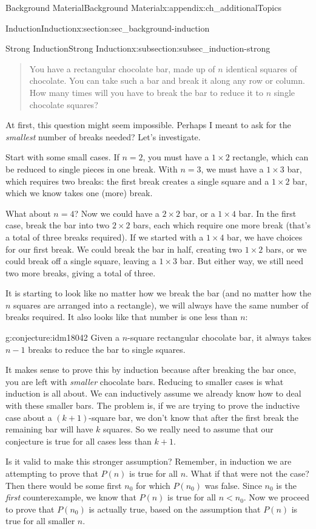 \documentclass[oneside,10pt,]{book}
\numberwithin{equation}{chapter}
\newcommand{\lt}{<}
\begin{document}
\begin{appendixptx}{Background Material}{}{Background Material}{}{}{x:appendix:ch_additionalTopics}
\begin{sectionptx}{Induction}{}{Induction}{}{}{x:section:sec_background-induction}
\begin{subsectionptx}{Strong Induction}{}{Strong Induction}{}{}{x:subsection:subsec_induction-strong}
\begin{quote}%
You have a rectangular chocolate bar, made up of \(n\) identical squares of chocolate.  You can take such a bar and break it along any row or column.  How many times will you have to break the bar to reduce it to \(n\) single chocolate squares?%
\end{quote}
At first, this question might seem impossible.  Perhaps I meant to ask for the \emph{smallest} number of breaks needed?  Let's investigate.%
\par
Start with some small cases.  If \(n=2\), you must have a \(1\times 2\) rectangle, which can be reduced to single pieces in one break.  With \(n=3\), we must have a \(1\times 3\) bar, which requires two breaks: the first break creates a single square and a \(1\times 2\) bar, which we know takes one (more) break.%
\par
What about \(n=4\)?  Now we could have a \(2\times 2\) bar, or a \(1 \times 4\) bar.  In the first case, break the bar into two \(2\times 2\) bars, each which require one more break (that's a total of three breaks required).  If we started with a \(1 \times 4\) bar, we have choices for our first break.  We could break the bar in half, creating two \(1\times 2\) bars, or we could break off a single square, leaving a \(1\times 3\) bar.  But either way, we still need two more breaks, giving a total of three.%
\par
It is starting to look like no matter how we break the bar (and no matter how the \(n\) squares are arranged into a rectangle), we will always have the same number of breaks required.  It also looks like that number is one less than \(n\):%
\begin{conjecture}{}{}{g:conjecture:idm18042}%
Given a \(n\)-square rectangular chocolate bar, it always takes \(n-1\) breaks to reduce the bar to single squares.%
\end{conjecture}
It makes sense to prove this by induction because after breaking the bar once, you are left with \emph{smaller} chocolate bars.  Reducing to smaller cases is what induction is all about.  We can inductively assume we already know how to deal with these smaller bars.  The problem is, if we are trying to prove the inductive case about a \((k+1)\)-square bar, we don't know that after the first break the remaining bar will have \(k\) squares.  So we really need to assume that our conjecture is true for all cases less than \(k+1\).%
\par
Is it valid to make this stronger assumption?  Remember, in induction we are attempting to prove that \(P(n)\) is true for all \(n\).  What if that were not the case?  Then there would be some first \(n_0\) for which \(P(n_0)\) was false.  Since \(n_0\) is the \emph{first} counterexample, we know that \(P(n)\) is true for all \(n \lt n_0\).  Now we proceed to prove that \(P(n_0)\) is actually true, based on the assumption that \(P(n)\) is true for all smaller \(n\).%

\end{subsectionptx}
\end{sectionptx}
\end{appendixptx}
\end{document}
